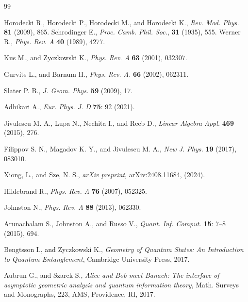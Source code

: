 \documentclass[reqno, 12pt,a4letter]{amsart}
\theoremstyle{definition}
\theoremstyle{plain}
\begin{document}
\begin{thebibliography}{99}
	
	Horodecki R., Horodecki P., Horodecki M., and Horodecki K., {\em Rev. Mod. Phys.} {\bf 81} (2009), 865.
        Schrodinger E., {\em Proc. Camb. Phil. Soc.}, {\bf 31} (1935), 555.
	Werner R., {\em Phys. Rev. A} {\bf 40} (1989), 4277.
	
	Kus M., and Zyczkowski K., {\em Phys. Rev. A} {\bf 63} (2001), 032307.
	
	Gurvits L., and Barnum H., {\em Phys. Rev. A.} {\bf 66} (2002), 062311.
	
	Slater P. B., {\em J. Geom. Phys.} {\bf 59} (2009), 17.
	
	Adhikari A., {\em Eur. Phys. J. D} {\bf 75}: 92 (2021).
	
	Jivulescu M. A., Lupa N., Nechita I., and Reeb D., {\em Linear Algebra Appl.} {\bf 469} (2015), 276.
	
	  Filippov S. N.,  Magadov K. Y., and  Jivulescu M. A., {\em New J. Phys.} {\bf 19} (2017), 083010.
	
	Xiong, L., and Sze, N. S., {\em arXiv preprint}, arXiv:2408.11684, (2024).
	
	Hildebrand R., {\em Phys.
		Rev. A} {\bf 76} (2007), 052325.
	
	Johnston N., {\em Phys. Rev. A} {\bf 88} (2013), 062330.
	
	Arunachalam S., Johnston A., and
	Russo V., {\em Quant. Inf. Comput.} {\bf 15}: 7--8 (2015), 694.
	
	Bengtsson I., and Zyczkowski K., {\em Geometry of Quantum States: An Introduction to Quantum Entanglement}, Cambridge University Press, 2017.
	
	Aubrun G., and Szarek S., {\em Alice and Bob meet Banach: The interface of asymptotic geometric analysis and quantum information theory}, Math. Surveys and Monographs, 223, AMS, Providence, RI, 2017.
	
\end{thebibliography}
\end{document}
